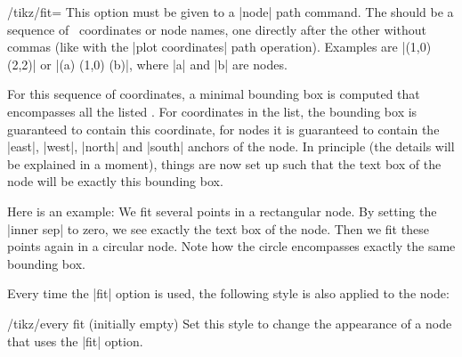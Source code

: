 \begin{key}{/tikz/fit=}
    This option must be given to a |node| path command. The  should be a sequence of \tikzname\ coordinates or node names,
    one directly after the other without commas (like with the
    |plot coordinates| path operation). Examples are |(1,0) (2,2)| or
    |(a) (1,0) (b)|, where |a| and |b| are nodes.

    For this sequence of coordinates, a minimal bounding box is computed that
    encompasses all the listed . For coordinates in
    the list, the bounding box is guaranteed to contain this coordinate, for
    nodes it is guaranteed to contain the |east|, |west|, |north| and |south|
    anchors of the node. In principle (the details will be explained in a
    moment), things are now set up such that the text box of the node will be
    exactly this bounding box.

    Here is an example: We fit several points in a rectangular node. By setting
    the |inner sep| to zero, we see exactly the text box of the node. Then we
    fit these points again in a circular node. Note how the circle encompasses
    exactly the same bounding box.
\begin{codeexample}[]
\end{codeexample}

    Every time the |fit| option is used, the following style is also applied to
    the node:
    \begin{stylekey}{/tikz/every fit (initially \normalfont empty)}
        Set this style to change the appearance of a node that uses the |fit|
        option.
    \end{stylekey}


\end{key}
